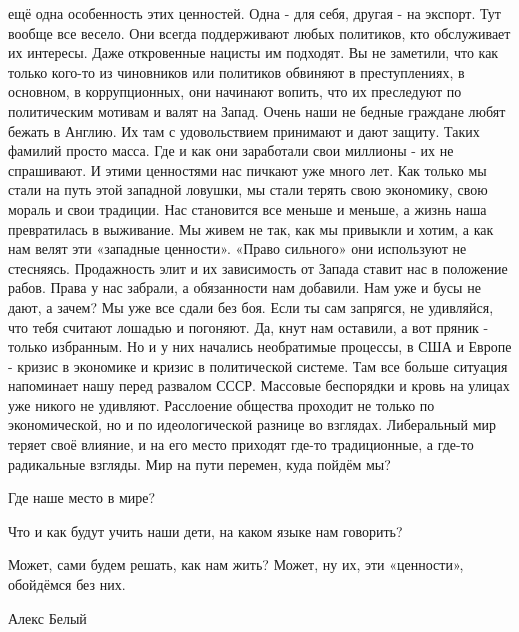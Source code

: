 ещё одна особенность этих ценностей.  Одна - для себя, другая - на экспорт.
Тут вообще все весело.  Они всегда поддерживают любых политиков, кто
обслуживает их интересы.  Даже откровенные нацисты им подходят.  Вы не
заметили, что как только кого-то из чиновников или политиков обвиняют в
преступлениях, в основном, в коррупционных,  они начинают вопить, что их
преследуют по политическим мотивам и валят на Запад.  Очень наши не бедные
граждане любят бежать в Англию.  Их там с удовольствием принимают и дают
защиту.  Таких фамилий просто масса.  Где и как они заработали свои миллионы -
их не спрашивают.  И этими ценностями нас пичкают уже много лет.  Как только мы
стали на путь этой западной ловушки, мы стали терять свою экономику, свою
мораль и свои традиции.  Нас становится все меньше и меньше, а жизнь наша
превратилась в выживание.  Мы живем не так, как мы привыкли и хотим, а как нам
велят эти «западные ценности».  «Право сильного» они используют не стесняясь.
Продажность элит и их зависимость от Запада ставит нас в положение рабов.
Права у нас забрали, а обязанности нам добавили.  Нам уже и бусы не дают, а
зачем?  Мы уже все сдали без боя.  Если ты сам запрягся, не удивляйся, что тебя
считают лошадью и погоняют. Да, кнут нам оставили, а вот пряник - только
избранным.  Но и у них начались необратимые процессы, в США и Европе - кризис в
экономике и кризис в политической системе.  Там все больше ситуация напоминает
нашу перед развалом СССР.  Массовые беспорядки и кровь на улицах уже никого не
удивляют.  Расслоение общества проходит не только по экономической, но и по
идеологической разнице во взглядах.  Либеральный мир теряет своё влияние, и на
его место приходят где-то традиционные, а где-то радикальные взгляды.  Мир на
пути перемен, куда пойдём мы?  

Где наше место в мире? 

Что и как будут учить наши дети, на каком языке нам говорить?  

Может, сами будем решать, как нам
жить?  Может, ну их, эти «ценности», обойдёмся без них.  

Алекс Белый
